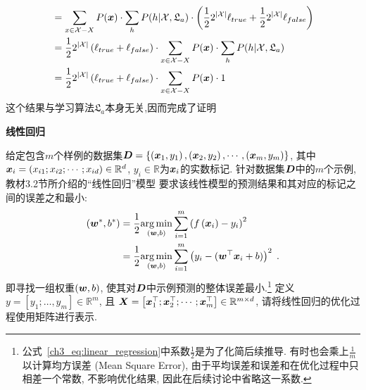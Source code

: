 \documentclass[answers]{exam}  %
\begin{document}
\begin{questions}
\begin{solution}
\begin{description}
\begin{align*}
				                                         & = \sum_{x\in\mathcal{X}-X}P({\boldsymbol{x}})\cdot\sum_h P(h|\mathcal{X},\mathfrak{L}_a)\cdot\left(\frac{1}{2}2^{|\mathcal X|}\ell_{true}+\frac{1}{2}2^{|\mathcal{X}|}\ell_{false}\right) \\
				                                         & =\frac{1}{2}2^{|\mathcal X|}\left(\ell_{true}+\ell_{false}\right)\cdot\sum_{x\in\mathcal{X}-X}P({\boldsymbol{x}})\cdot\sum_h P(h|\mathcal{X},\mathfrak{L}_a)                              \\
				                                         & =\frac{1}{2}2^{|\mathcal X|}\left(\ell_{true}+\ell_{false}\right)\cdot\sum_{x\in\mathcal{X}-X}P({\boldsymbol{x}})\cdot 1
			      \end{align*}
			      这个结果与学习算法$\mathfrak{L}_a$本身无关,因而完成了证明
		\end{description}
	\end{solution}


	\question [15] \textbf{线性回归}

	给定包含$m$个样例的数据集$\boldsymbol{D}=\left\{\left({\boldsymbol{x}}_{1}, y_{1}\right),\left({\boldsymbol{x}}_{2}, y_{2}\right), \cdots,\left({\boldsymbol{x}}_{m}, y_{m}\right)\right\}$, 其中${\boldsymbol{x}}_{i}=\left(x_{i 1} ; x_{i 2} ; \cdots ; x_{i d}\right) \in \mathbb{R}^{d}$, $y_{i} \in\mathbb{R}$为${\boldsymbol{x}}_{i}$的实数标记.
	针对数据集$\boldsymbol{D}$中的$m$个示例, 教材3.2节所介绍的“线性回归”模型 要求该线性模型的预测结果和其对应的标记之间的误差之和最小:
	\begin{align}
		\left(\boldsymbol{w}^{*}, b^{*}\right) & =\frac{1}{2}\underset{(\boldsymbol{w}, b)}{\arg \min } \sum_{i=1}^{m}\left(f\left({\boldsymbol{x}}_{i}\right)-y_{i}\right)^{2} \notag                            \\
		                            & =\frac{1}{2}\underset{(\boldsymbol{w}, b)}{\arg \min } \sum_{i=1}^{m}\left(y_{i}-(\boldsymbol{w}^\top {\boldsymbol{x}}_{i}+b)\right)^{2}\;.\label{ch3_eq:linear_regression}
	\end{align}
	即寻找一组权重$(\boldsymbol{w}, b)$, 使其对$\boldsymbol{D}$中示例预测的整体误差最小.\footnote{公式~\ref{ch3_eq:linear_regression}中系数$\frac{1}{2}$是为了化简后续推导. 有时也会乘上$\frac{1}{m}$以计算均方误差 (Mean Square Error), 由于平均误差和误差和在优化过程中只相差一个常数, 不影响优化结果, 因此在后续讨论中省略这一系数.}
	定义$y=\left[y_{1}; \ldots, y_{m}\right] \in \mathbb{R}^{m}$, 且 $\boldsymbol{X}=\left[{\boldsymbol{x}}_{1}^\top ; {\boldsymbol{x}}_{2}^\top ; \cdots ; {\boldsymbol{x}}_{m}^\top\right] \in \mathbb{R}^{m \times d}$, 请将线性回归的优化过程使用矩阵进行表示.


\end{questions}
\end{document}

